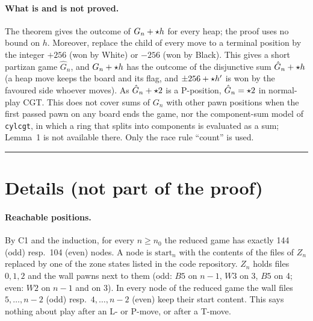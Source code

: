 \begin{wallproof}
\paragraph{What is and is not proved.}
The theorem gives the outcome of $G_n+\mathord{\star h}$ for every heap; the proof uses no bound on $h$. Moreover, replace the child of every move
to a terminal position by the integer $+256$ (won by White) or $-256$ (won by Black). This gives a short partizan game $\hat G_n$, and
$G_n+\mathord{\star h}$ has the outcome of the disjunctive sum $\hat G_n+\mathord{\star h}$ (a heap move keeps the board and its flag, and $\pm256+\mathord{\star h'}$ is won
by the favoured side whoever moves). As $\hat G_n+\mathord{\star2}$ is a P-position, $\hat G_n=\mathord{\star2}$ in normal-play CGT. This does not cover sums of
$G_n$ with other pawn positions when the first passed pawn on any board ends the game, nor the component-sum model of \texttt{cylcgt},
in which a ring that splits into components is evaluated as a sum; Lemma~1 is not available there. Only the race rule ``count'' is used.
\end{wallproof}

\bigskip\hrule\bigskip
\section*{Details (not part of the proof)}

\paragraph{Reachable positions.} By C1 and the induction, for every $n\ge n_0$ the reduced game has exactly 144 (odd) resp.\ 104 (even)
nodes. A node is $\mathrm{start}_n$ with the contents of the files of $Z_n$ replaced by one of the zone states listed in the code
repository. $Z_n$ holds files $0,1,2$ and the wall pawns next to them (odd: $B5$ on $n-1$, $W3$ on 3, $B5$ on 4; even: $W2$ on $n-1$ and
on 3). In every node of the reduced game the wall files $5,\dots,n-2$ (odd) resp.\ $4,\dots,n-2$ (even) keep their start content. This
says nothing about play after an L- or P-move, or after a T-move.

